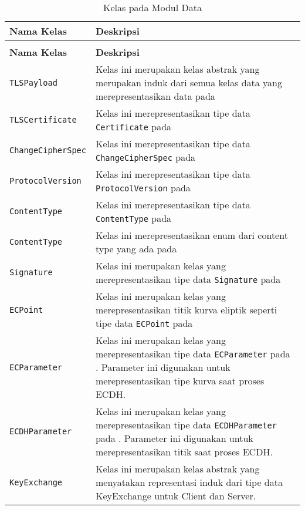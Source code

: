 \begin{longtable}{|p{3.5cm}|p{9cm}|}
    \caption{Kelas pada Modul Data} \label{tab:impl.data} \\
    \hline
    \textbf{Nama Kelas} & \textbf{Deskripsi} \\ \hline
    
    \endfirsthead
    \caption[]{Kelas pada Modul Data} \\
    
    \hline
    \textbf{Nama Kelas} & \textbf{Deskripsi} \\ \hline
    \endhead

    \texttt{TLSPayload} & Kelas ini merupakan kelas abstrak yang merupakan induk dari semua kelas data yang merepresentasikan data pada \textcite{rfc5246}\\ \hline
    \texttt{TLSCertificate} & Kelas ini merepresentasikan tipe data \texttt{Certificate} pada \textcite{rfc5246} \\ \hline
    \texttt{ChangeCipherSpec} & Kelas ini merepresentasikan tipe data \texttt{ChangeCipherSpec} pada \textcite{rfc5246} \\ \hline
    \texttt{ProtocolVersion} & Kelas ini merepresentasikan tipe data \texttt{ProtocolVersion} pada \textcite{rfc5246} \\ \hline
    \texttt{ContentType} & Kelas ini merepresentasikan tipe data \texttt{ContentType} pada \textcite{rfc5246} \\ \hline
    \texttt{ContentType} & Kelas ini merepresentasikan enum dari content type yang ada pada \textcite{rfc5246} \\ \hline
    \texttt{Signature} & Kelas ini merupakan kelas yang merepresentasikan tipe data \texttt{Signature} pada \textcite{rfc5246}\\ \hline
    \texttt{ECPoint} & Kelas ini merupakan kelas yang merepresentasikan titik kurva eliptik seperti tipe data \texttt{ECPoint} pada \textcite{rfc4492}\\ \hline
    \texttt{ECParameter} & Kelas ini merupakan kelas yang merepresentasikan tipe data \texttt{ECParameter} pada \textcite{rfc4492}. Parameter ini digunakan untuk merepresentasikan tipe kurva saat proses ECDH.\\ \hline
    \texttt{ECDHParameter} & Kelas ini merupakan kelas yang merepresentasikan tipe data \texttt{ECDHParameter} pada \textcite{rfc4492}. Parameter ini digunakan untuk merepresentasikan titik saat proses ECDH.\\ \hline
    \texttt{KeyExchange} & Kelas ini merupakan kelas abstrak yang menyatakan representasi induk dari tipe data KeyExchange untuk Client dan Server.\\ \hline

\end{longtable}
